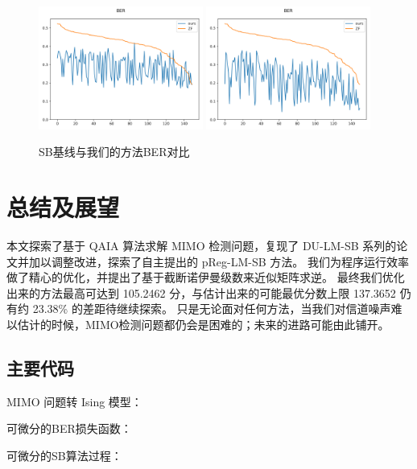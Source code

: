 \documentclass[withoutpreface,bwprint]{cumcmthesis}
\begin{document}
\begin{figure}
	\centering
	{\includegraphics[width=0.48\textwidth]{figures/solut-baseline.png}}
	{\includegraphics[width=0.48\textwidth]{figures/solut-ours.png}}
	\caption{SB基线与我们的方法BER对比}
	\label{fig:result-cmp}
\end{figure}


\section{总结及展望}

本文探索了基于 QAIA 算法求解 MIMO 检测问题，复现了 DU-LM-SB 系列的论文并加以调整改进，探索了自主提出的 pReg-LM-SB 方法。
我们为程序运行效率做了精心的优化，并提出了基于截断诺伊曼级数来近似矩阵求逆。
最终我们优化出来的方法最高可达到 105.2462 分，与估计出来的可能最优分数上限 137.3652 仍有约 23.38\% 的差距待继续探索。
只是无论面对任何方法，当我们对信道噪声难以估计的时候，MIMO检测问题都仍会是困难的；未来的进路可能由此铺开。


\newpage

\nocite{*}


\newpage
\begin{appendices}

\section{主要代码}

MIMO 问题转 Ising 模型：



\newpage
可微分的BER损失函数：



\newpage
可微分的SB算法过程：



\end{appendices}
\end{document}
